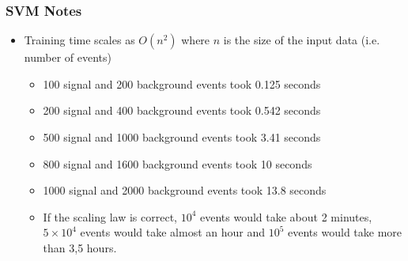 \subsubsection{SVM Notes}
\begin{itemize}
\item Training time scales as $O(n^2)$ where $n$ is the size of the
  input data (i.e. number of events)
  \begin{itemize}
  \item 100 signal and 200 background events took 0.125 seconds
  \item 200 signal and 400 background events took 0.542 seconds
  \item 500 signal and 1000 background events took 3.41 seconds
  \item 800 signal and 1600 background events took 10 seconds
  \item 1000 signal and 2000 background events took 13.8 seconds
  \item If the scaling law is correct, $10^4$ events would take about 2
    minutes, $5\times 10^4$ events would take almost an hour and $10^5$
    events would take more than 3,5 hours.
  \end{itemize}
\end{itemize}

